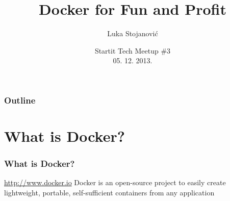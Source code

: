\documentclass{beamer}
\title{Docker for Fun and Profit}
\author{Luka Stojanović}
\institute{
  luka@magrathea.rs \\
  Seven Bridges Genomics
}
\date{Startit Tech Meetup \#3\\ 05. 12. 2013.}
\begin{document}
  \begin{frame}
    \titlepage
  \end{frame}
  
  \begin{frame}
    \frametitle{Outline}
    \tableofcontents
  \end{frame}
  
  \section{What is Docker?}
  \begin{frame}
    \frametitle{What is Docker?}
    
    \begin{block}{\url{http://www.docker.io}}
    	Docker is an open-source project to easily create lightweight, 
    	portable, self-sufficient containers from any application
    \end{block}
    
    
  \end{frame}
  
\end{document}
